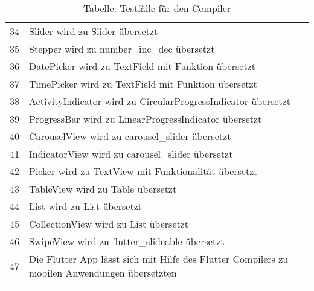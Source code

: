 \begin{xltabular}{\textwidth}{l|X|l}
	34            			& Slider		       					wird zu 		Slider	 		übersetzt &  \checkmark   	\\
	35            			& Stepper		       				wird zu  		number\_inc\_dec	 		übersetzt &  \checkmark   	\\
	36            			& DatePicker		       			wird zu  		TextField mit Funktion		übersetzt &  \checkmark   	\\
	37            			& TimePicker		       			wird zu  		TextField mit Funktion	 		übersetzt &  \checkmark   	\\
	38            			& ActivityIndicator		       	wird zu  		CircularProgressIndicator 		übersetzt &  \checkmark   	\\
	39            			& ProgressBar		       			wird zu 		LinearProgressIndicator 		übersetzt &  \checkmark   	\\
	40            			& CarouselView		       		wird zu  		carousel\_slider  		übersetzt &  \checkmark   	\\
	41            			& IndicatorView		       		wird zu  		carousel\_slider			übersetzt &  \checkmark   	\\
	42            			& Picker		       					wird zu  		TextView mit Funktionalität 		übersetzt &  \checkmark   	\\
	43            			& TableView		       				wird zu  		Table		übersetzt &  \checkmark   	\\
	44            			& List		       						wird zu  		List 		übersetzt &  \checkmark   	\\
	45            			& CollectionView		       		wird zu  		List 		übersetzt &  \checkmark   	\\
	46            			& SwipeView		       			wird zu  		flutter\_slideable 		übersetzt &  \checkmark   	\\
	47            			& Die Flutter App lässt sich mit Hilfe des Flutter Compilers zu mobilen Anwendungen übersetzten &  \checkmark   	\\

	  \caption*{Tabelle: Testfälle für den Compiler}

 \label{tab:Testcasescomplete}
\end{xltabular}

